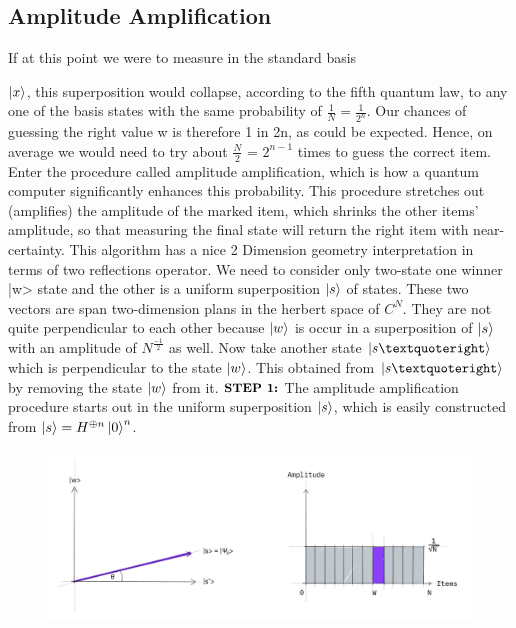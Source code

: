 \documentclass[letterpaper,11pt]{article}
\begin{document}
\subsection{Amplitude Amplification}
If at this point we were to measure in the standard basis {$\ket{x}$, this superposition would collapse, according to the fifth quantum law, to any one of the basis states with the same probability of $\frac{1}{N} = \frac{1}{2^n}$. Our chances of guessing the right value w is therefore 1 in 2n, as could be expected. Hence, on average we would need to try about $\frac{N}{2}$ = $2^{n-1}$ times to guess the correct item.
\newline
\newline
Enter the procedure called amplitude amplification, which is how a quantum computer significantly enhances this probability. This procedure stretches out (amplifies) the amplitude of the marked item, which shrinks the other items' amplitude, so that measuring the final state will return the right item with near-certainty.
This algorithm has a nice 2 Dimension geometry interpretation in terms of  two reflections operator. We need to consider only two-state one winner |w> state and the other is a uniform superposition $\ket{s}$ of states. These two vectors are span two-dimension plans in the herbert space of $C^N$. They are not quite perpendicular to each other because $\ket{w}$ is occur in a superposition of $\ket{s} $with an amplitude of $N^\frac{-1}{2}$ as well. Now take another state $\ket{s’}$ which is perpendicular to the state  $\ket{w}$. This obtained from $\ket{s’}$ by removing the state $\ket{w}$ from it.
\newline
\newline
$\small\textbf{STEP 1:}$ 
The amplitude amplification procedure starts out in the uniform superposition $\ket{s}$, which is easily constructed from $\ket{s} = H^{\oplus n}\ket{0}^n$.

\begin{figure}[h!]
    \includegraphics[width=\linewidth]{grover_step1.jpg}
\end{figure}

}
\end{document}
